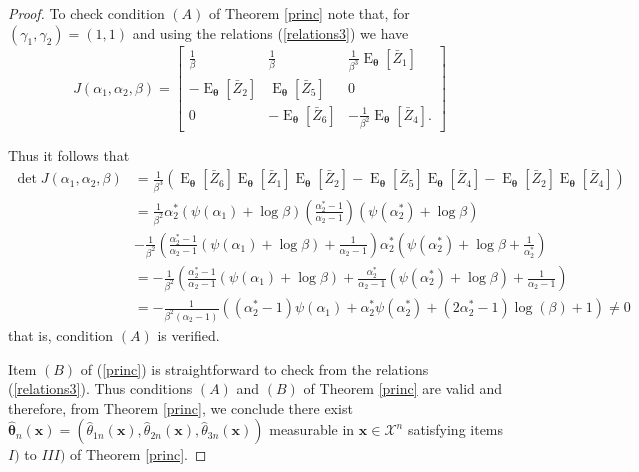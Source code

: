 \documentclass[12pt]{article} %
\newcommand{\bs}{\boldsymbol}
\newcommand{\on}{\operatorname}
\theoremstyle{definition}
\begin{document}
\begin{proof}
To check condition $(A)$ of Theorem \ref{princ} note that, for $(\gamma_1,\gamma_2)=(1,1)$ and using the relations (\ref{relations3}) we have
\begin{equation}\label{mfishergg2}
J(\alpha_1,\alpha_2,\beta)=
\begin{bmatrix}
 \frac{1}{\beta}  & \frac{1}{\beta} &  \frac{1}{\beta^3}\on{E}_{\bs{\theta}}\left[\bar{Z}_1\right]\\
 -\on{E}_{\bs{\theta}}\left[\bar{Z}_2\right] &  \on{E}_{\bs{\theta}}\left[\bar{Z}_5\right] & 0\\
 0 & - \on{E}_{\bs{\theta}}\left[\bar{Z}_6\right] & - \frac{1}{\beta^2} \on{E}_{\bs{\theta}}\left[\bar{Z}_4\right].
\end{bmatrix}
\end{equation}

Thus it follows that
\begin{equation*}
\begin{aligned}
 \on{det} J(\alpha_1,\alpha_2,\beta) &= \frac{1}{\beta^3}\left(\on{E}_{\bs{\theta}}\left[\bar{Z}_6\right]\on{E}_{\bs{\theta}}\left[\bar{Z}_1\right]\on{E}_{\bs{\theta}}\left[\bar{Z}_2\right] - \on{E}_{\bs{\theta}}\left[\bar{Z}_5\right]\on{E}_{\bs{\theta}}\left[\bar{Z}_4\right] - \on{E}_{\bs{\theta}}\left[\bar{Z}_2\right]\on{E}_{\bs{\theta}}\left[\bar{Z}_4\right]\right)\\
&= \frac{1}{\beta^2} \alpha_2^*(\psi(\alpha_1)+\log\beta) \left(\frac{\alpha_2^*-1}{\alpha_2 - 1}\right)(\psi(\alpha_2^*) + \log \beta)\\
& - \frac{1}{\beta^2}\left(\frac{\alpha_2^*-1}{\alpha_2-1}(\psi(\alpha_1)+\log \beta)+\frac{1}{\alpha_2-1} \right)\alpha_2^*\left(\psi(\alpha_2^*) + \log \beta + \frac{1}{\alpha_2^*}\right)
\\
& = -\frac{1}{\beta^2}\left(\frac{\alpha_2^*-1}{\alpha_2-1}(\psi(\alpha_1)+\log\beta) + \frac{\alpha_2^*}{\alpha_2-1}\left(\psi(\alpha_2^*)+\log \beta\right) + \frac{1}{\alpha_2-1}\right)\\
& =-\frac{1}{\beta^2(\alpha_2-1)}\left((\alpha_2^*-1)\psi(\alpha_1) + \alpha_2^*\psi(\alpha_2^*) + (2\alpha_2^*-1)\log(\beta) + 1\right)\neq 0
\end{aligned}
\end{equation*}
that is, condition $(A)$ is verified. 

Item $(B)$ of (\ref{princ}) is straightforward to check from the relations (\ref{relations3}). Thus conditions $(A)$ and $(B)$ of Theorem \ref{princ} are valid and therefore, from Theorem \ref{princ}, we conclude there exist $\bs{\hat{\theta}}_n(\bs{x})=(\hat{\theta}_{1n}(\bs{x}),\hat{\theta}_{2n}(\bs{x}),\hat{\theta}_{3n}(\bs{x}))$ measurable in $\bs{x}\in \mathcal{X}^n$ satisfying items $I)$ to $III)$ of Theorem \ref{princ}.


\end{proof}
\end{document}
